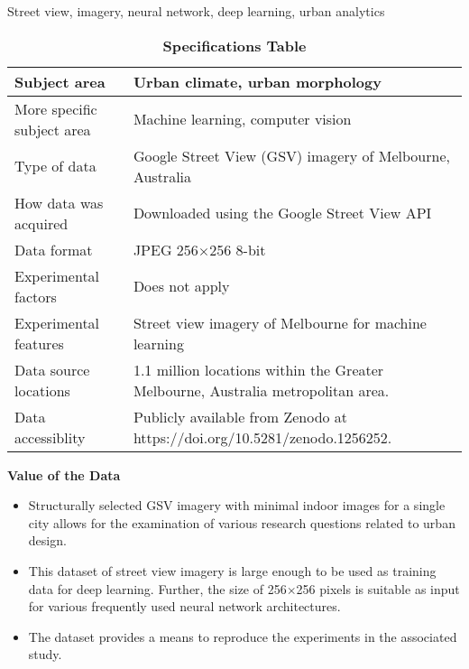 \documentclass[final,3p,times,authoryear]{elsarticle}
\begin{document}
\begin{frontmatter}
\begin{abstract}
\end{abstract}

\begin{keyword}
Street view, imagery, neural network, deep learning, urban analytics
\end{keyword}

\end{frontmatter}


\begin{table}[!htbp]
\caption{\bf Specifications Table \label{tab:spectable}}     
\begin{tabular}{ |l | l| }
 \hline    
Subject area & Urban climate, urban morphology   \\ \hline
More specific subject area & Machine learning, computer vision  \\ \hline
Type of data & Google Street View (GSV) imagery of Melbourne, Australia  \\ \hline
How data was acquired & Downloaded using the Google Street View API \citep{GoogleMaps2017b}  \\ \hline
Data format & JPEG 256$\times$256 8-bit  \\ \hline
Experimental factors & Does not apply  \\ \hline
Experimental features & Street view imagery of Melbourne for machine learning  \\ \hline
Data source locations & 1.1 million locations within the Greater Melbourne, Australia metropolitan area.  \\ \hline
Data accessiblity & Publicly available from Zenodo at https://doi.org/10.5281/zenodo.1256252.    \\ \hline
\end{tabular}
\end{table}

\textbf{Value of the Data}
\begin{itemize}
\item Structurally selected GSV imagery with minimal indoor images for a single city allows for the examination of various research questions related to urban design.
\item This dataset of street view imagery is large enough to be used as training data for deep learning. Further, the size of 256$\times$256 pixels is suitable as input for various frequently used neural network architectures.
\item The dataset provides a means to reproduce the experiments in the associated study.
\end{itemize}
\end{document}
